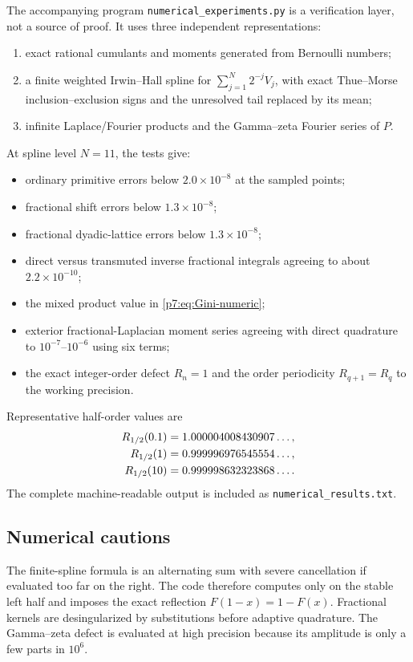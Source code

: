 \documentclass[11pt,oneside]{article}
\theoremstyle{definition}
\theoremstyle{remark}
\newcommand{\1}{\mathbf 1}
\begin{document}
The accompanying program \texttt{numerical\_experiments.py} is a verification layer, not a
source of proof.  It uses three independent representations:
\begin{enumerate}
\item exact rational cumulants and moments generated from Bernoulli numbers;
\item a finite weighted Irwin--Hall spline for
$\sum_{j=1}^{N}2^{-j}V_j$, with exact Thue--Morse inclusion--exclusion signs and the unresolved
tail replaced by its mean;
\item infinite Laplace/Fourier products and the Gamma--zeta Fourier series of $P$.
\end{enumerate}

At spline level $N=11$, the tests give:
\begin{itemize}
\item ordinary primitive errors below $2.0\times10^{-8}$ at the sampled points;
\item fractional shift errors below $1.3\times10^{-8}$;
\item fractional dyadic-lattice errors below $1.3\times10^{-8}$;
\item direct versus transmuted inverse fractional integrals agreeing to about $2.2\times10^{-10}$;
\item the mixed product value in \cref{p7:eq:Gini-numeric};
\item exterior fractional-Laplacian moment series agreeing with direct quadrature to
      $10^{-7}$--$10^{-6}$ using six terms;
\item the exact integer-order defect $R_n=1$ and the order periodicity $R_{q+1}=R_q$ to the
      working precision.
\end{itemize}

Representative half-order values are
\begin{align}
 R_{1/2}(0.1)&=1.000004008430907\ldots,\notag\\
 R_{1/2}(1)&=0.999996976545554\ldots,\notag\\
 R_{1/2}(10)&=0.999998632323868\ldots .
 \label{p7:eq:defect-half-numeric}
\end{align}
The complete machine-readable output is included as \texttt{numerical\_results.txt}.

\subsection{Numerical cautions}

The finite-spline formula is an alternating sum with severe cancellation if evaluated too far
on the right.  The code therefore computes only on the stable left half and imposes the exact
reflection $F(1-x)=1-F(x)$.  Fractional kernels are desingularized by substitutions before
adaptive quadrature.  The Gamma--zeta defect is evaluated at high precision because its
amplitude is only a few parts in $10^6$.
\end{document}
